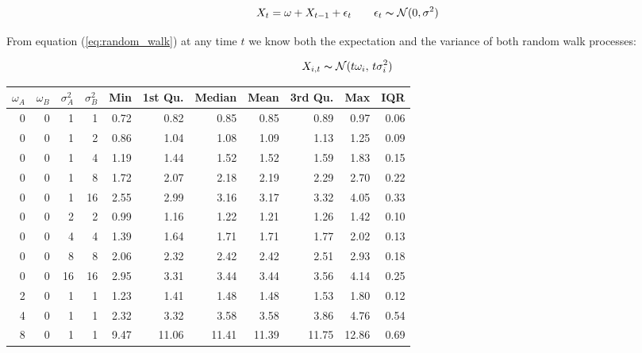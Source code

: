 \documentclass[12pt]{article}
\begin{document}
\begin{equation} \label{eq:random_walk}
    X_{t} = \omega + X_{t-1} + \epsilon_{t} \qquad \epsilon_{t} \thicksim \mathcal{N}(0, \sigma^{2})
\end{equation}

From equation (\ref{eq:random_walk}) at any time $t$ we know both the expectation and the variance of both random walk processes:

\begin{equation}
    X_{i,t} \thicksim \mathcal{N}(t\omega_{i}, \, t\sigma_{i}^{2})
\end{equation}


\begin{table}[!htb]
    \begin{center}
      \begin{tabular}{| r r r r | r r r r r r r |}
        \hline
        $\omega_{A}$ & $\omega_{B}$ & $\sigma^{2}_{A}$ & $\sigma^{2}_{B}$ & Min & 1st Qu. & Median & Mean & 3rd Qu. & Max & IQR \\
        \hline
        0  & 0 & 1  & 1  & 0.72  & 0.82  & 0.85  & 0.85  & 0.89  & 0.97  & 0.06 \\
        \hline
        0  & 0 & 1  & 2  & 0.86  & 1.04  & 1.08  & 1.09  & 1.13  & 1.25  & 0.09 \\
        0  & 0 & 1  & 4  & 1.19  & 1.44  & 1.52  & 1.52  & 1.59  & 1.83  & 0.15 \\
        0  & 0 & 1  & 8  & 1.72  & 2.07  & 2.18  & 2.19  & 2.29  & 2.70  & 0.22 \\
        0  & 0 & 1  & 16 & 2.55  & 2.99  & 3.16  & 3.17  & 3.32  & 4.05  & 0.33 \\
        \hline
        0  & 0 & 2  & 2  & 0.99  & 1.16  & 1.22  & 1.21  & 1.26  & 1.42  & 0.10 \\
        0  & 0 & 4  & 4  & 1.39  & 1.64  & 1.71  & 1.71  & 1.77  & 2.02  & 0.13 \\
        0  & 0 & 8  & 8  & 2.06  & 2.32  & 2.42  & 2.42  & 2.51  & 2.93  & 0.18 \\
        0  & 0 & 16 & 16 & 2.95  & 3.31  & 3.44  & 3.44  & 3.56  & 4.14  & 0.25 \\
        \hline
        2  & 0 & 1  & 1  &  1.23 &  1.41 &  1.48 &  1.48 &  1.53 &  1.80 & 0.12 \\
        4  & 0 & 1  & 1  &  2.32 &  3.32 &  3.58 &  3.58 &  3.86 &  4.76 & 0.54 \\
        8  & 0 & 1  & 1  &  9.47 & 11.06 & 11.41 & 11.39 & 11.75 & 12.86 & 0.69 \\

\end{tabular}
\end{center}
\end{table}
\end{document}
